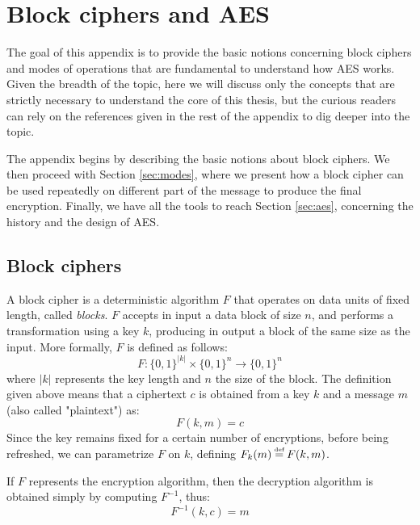 \documentclass[target=mst,aauheader=aics]{thud}
\newcommand\defeq{\stackrel{\mathclap{\normalfont\mbox{\tiny def}}}{=}}
\theoremstyle{definition}
\begin{document}
\chapter{Block ciphers and AES}\label{appendix:aes}
The goal of this appendix is to provide the basic notions concerning block ciphers and modes of operations that are fundamental to understand how AES works. Given the breadth of the topic, here we will discuss only the concepts that are strictly necessary to understand the core of this thesis, but the curious readers can rely on the references given in the rest of the appendix to dig deeper into the topic.

The appendix begins by describing the basic notions about block ciphers. We then proceed with Section \ref{sec:modes}, where we present how a block cipher can be used repeatedly on different part of the message to produce the final encryption. Finally, we have all the tools to reach Section \ref{sec:aes}, concerning the history and the design of AES.

\section{Block ciphers}\label{sec:block-ciphers}
A block cipher is a deterministic algorithm $F$ that operates on data units of fixed length, called \textit{blocks}. $F$ accepts in input a data block of size $n$, and performs a transformation using a key $k$, producing in output a block of the same size as the input. More formally, $F$ is defined as follows:
\[
F: \{0,1\}^{|k|} \times \{0,1\}^n \rightarrow \{0,1\}^n
\]
where $|k|$ represents the key length and $n$ the size of the block. The definition given above means that a ciphertext $c$ is obtained from a key $k$ and a message $m$ (also called "plaintext") as:
\[
F(k,m) = c
\]
Since the key remains fixed for a certain number of encryptions, before being refreshed, we can parametrize $F$ on $k$, defining $F_k(m) \defeq F(k,m)$.

If $F$ represents the encryption algorithm, then the decryption algorithm is obtained simply by computing $F^{-1}$, thus:
\[
F^{-1}(k,c) = m
\]
\end{document}
